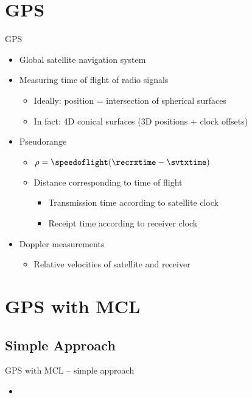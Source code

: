 \documentclass[utf8]{beamer}
\begin{document}
\section{GPS}
\begin{frame}{GPS}
    \begin{itemize}
        \item Global satellite navigation system
        \item Measuring time of flight of radio signals
        \begin{itemize}
            \item Ideally: position = intersection of spherical surfaces
            \item In fact: 4D conical surfaces (3D positions + clock offsets)
        \end{itemize}
        \item Pseudorange
        \begin{itemize}
            \item \(\rho = \speedoflight (\recrxtime - \svtxtime)\)
            \item Distance corresponding to time of flight
            \begin{itemize}
                \item Transmission time according to satellite clock
                \item Receipt time according to receiver clock
            \end{itemize}
        \end{itemize}
        \item Doppler measurements
        \begin{itemize}
            \item Relative velocities of satellite and receiver
        \end{itemize}
    \end{itemize}
\end{frame}

\section{GPS with MCL}
\subsection{Simple Approach}
\begin{frame}{GPS with MCL -- simple approach}
    \begin{itemize}
        \item
    \end{itemize}
\end{frame}
\end{document}
